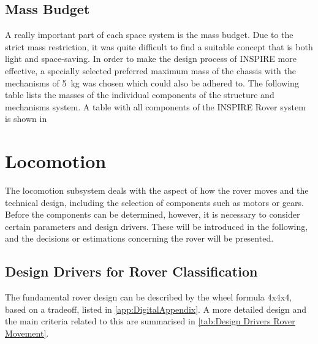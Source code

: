 \subsection{Mass Budget}

A really important part of each space system is the mass budget. Due to the strict mass restriction, it was quite difficult to find a suitable concept that is both light and space-saving. In order to make the design process of INSPIRE more effective, a specially selected preferred maximum mass of the chassis with the mechanisms of 5~kg was chosen which could also be adhered to. The following table lists the masses of the individual components of the structure and mechanisms system. 
A table with all components of the INSPIRE Rover system is shown in %

\section{Locomotion} \label{sec:locomotion}

The locomotion subsystem deals with the aspect of how the rover moves and the technical design, including the selection of components such as motors or gears. Before the components can be determined, however, it is necessary to consider certain parameters and design drivers. These will be introduced in the following, and the decisions or estimations concerning the rover will be presented.

\subsection{Design Drivers for Rover Classification}
\label{sec:DesignDriversLoco}

The fundamental rover design can be described by the wheel formula 4x4x4, based on a tradeoff, listed in \autoref{app:DigitalAppendix}. A more detailed design and the main criteria related to this are summarised in \autoref{tab:Design Drivers Rover Movement}.

